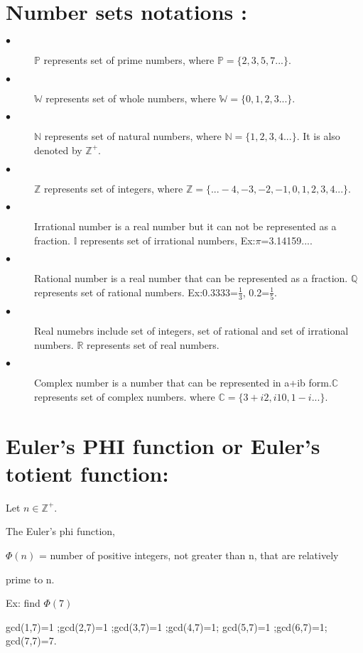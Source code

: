 \documentclass{article}
\begin{document}
   \section{Number sets notations :}
   \begin{description}
   	\item[$\bullet$] $\mathbb{P}$ represents set of prime numbers, where $\mathbb{P}=\{ 2, 3, 5, 7... \}$.
   	\item[$\bullet$] $\mathbb{W}$ represents set of whole numbers, where $\mathbb{W}=\{ 0, 1, 2, 3... \}$.
   	\item[$\bullet$] $\mathbb{N}$ represents set of natural numbers, where $\mathbb{N}=\{ 1, 2, 3, 4 ... \}$. It is also denoted by $\mathbb{Z^{+}}$.
   	\item[$\bullet$] $\mathbb{Z}$ represents set of integers, where $\mathbb{Z}=\{...-4, -3, -2, -1, 0, 1, 2, 3, 4... \}$.
   	\item[$\bullet$] Irrational number is a real number but it can not be represented as a fraction.
   	$\mathbb{I}$ represents set of irrational numbers, Ex:$\pi$=3.14159....
   	\item[$\bullet$] Rational number is a real number that can be represented as a fraction. $\mathbb{Q}$ represents set of rational numbers.
   	 Ex:0.3333=$\frac{1}{3}$, 0.2=$\frac{1}{5}$.
   	\item[$\bullet$] Real numebrs include set of integers, set of rational  and set of irrational numbers. $\mathbb{R}$ represents set of real numbers.
   	\item[$\bullet$] Complex number is a number that can be represented in a+ib form.$\mathbb{C}$ represents set of complex numbers.
   	 where $\mathbb{C}=\{ 3+i2, i10, 1-i ... \}$.
   \end{description}
    
    \section{Euler's PHI function or Euler's totient function:}
    Let $n\in\mathbb{Z^{+}}$.
    
    The Euler's phi function,
    
    $\Phi(n)$ = number of positive integers, not greater than n, that are relatively 
    
    prime to n.
    
    
     Ex: find $\Phi(7)$
    
    gcd(1,7)=1 ;gcd(2,7)=1 ;gcd(3,7)=1 ;gcd(4,7)=1;
    gcd(5,7)=1  ;gcd(6,7)=1; gcd(7,7)=7.
    
\end{document}
